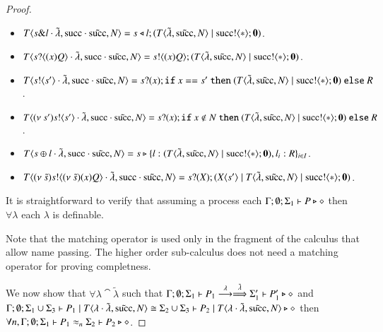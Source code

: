 \begin{proof}
\begin{itemize}
		\item	$T\langle s \& l \cdot \tilde{\lambda}, \textrm{succ} \cdot \tilde{\textrm{succ}}, N \rangle = s \triangleleft l ; (T\langle \tilde{\lambda}, \tilde{\textrm{succ}}, N \rangle \;|\; \textrm{succ} ! \langle \ast \rangle ; \mathbf{0})$.

		\item	$T\langle s ? \langle (x)Q \rangle \cdot \tilde{\lambda}, \textrm{succ} \cdot \tilde{\textrm{succ}}, N \rangle = s ! \langle (x)Q \rangle ; (T\langle \tilde{\lambda}, \tilde{\textrm{succ}}, N \rangle \;|\; \textrm{succ} ! \langle \ast \rangle ; \mathbf{0})$.

		\item	$T\langle s ! \langle s' \rangle \cdot \tilde{\lambda}, \textrm{succ} \cdot \tilde{\textrm{succ}}, N \rangle = s ? (x) ; \mathtt{if}\  x == s'\ \mathtt{then}\  (T\langle \tilde{\lambda}, \tilde{\textrm{succ}}, N \rangle \;|\; \textrm{succ} ! \langle \ast \rangle ; \mathbf{0})\  \mathtt{else}\  R$.

		\item	$T\langle (\nu\ s') s ! \langle s' \rangle \cdot \tilde{\lambda}, \textrm{succ} \cdot \tilde{\textrm{succ}}, N \rangle = s ? (x) ; \mathtt{if}\  x \notin N\ \mathtt{then}\  (T\langle \tilde{\lambda}, \tilde{\textrm{succ}}, N \rangle \;|\; \textrm{succ} ! \langle \ast \rangle ; \mathbf{0})\  \mathtt{else}\  R$.

		\item	$T\langle s \oplus l \cdot \tilde{\lambda}, \textrm{succ} \cdot \tilde{\textrm{succ}}, N \rangle = s \triangleright \{l:(T\langle \tilde{\lambda}, \tilde{\textrm{succ}}, N \rangle \;|\; \textrm{succ} ! \langle \ast \rangle ; \mathbf{0}), l_i: R\}_{i \in I}$.

		\item	$T\langle (\nu\ \tilde{s}) s ! \langle (\nu\ \tilde{s}) (x)Q \rangle \cdot \tilde{\lambda}, \textrm{succ} \cdot \tilde{\textrm{succ}}, N \rangle = s ? (X) ; (X\langle s' \rangle \;|\; T\langle \tilde{\lambda}, \tilde{\textrm{succ}}, N \rangle \;|\; \textrm{succ} ! \langle \ast \rangle ; \mathbf{0})$. 
	\end{itemize}

	It is straightforward to verify that assuming a process each $\Gamma; \emptyset; \Sigma_1 \vdash P \triangleright \diamond$ then $\forall \lambda$ each $\lambda$ is definable.

	Note that the matching operator is used only in the fragment of
	the calculus that allow name passing. The higher order sub-calculus
	does not need a matching operator for proving completness.

	We now show that $\forall \lambda \cat \tilde{\lambda}$ such that $\Gamma; \emptyset; \Sigma_1 \vdash P_1 \stackrel{\lambda}{\longrightarrow} \stackrel{\tilde{\lambda}}{\Longrightarrow} \Sigma_1' \vdash P_1' \triangleright \diamond$
	and $\Gamma; \emptyset; \Sigma_1 \cup \Sigma_3 \vdash P_1 \;|\; T\langle \lambda \cdot \tilde{\lambda}, \tilde{\textrm{succ}}, N \rangle \cong \Sigma_2 \cup \Sigma_3 \vdash P_2 \;|\; T\langle \lambda \cdot \tilde{\lambda}, \tilde{\textrm{succ}}, N \rangle \triangleright \diamond$ then $\forall n, \Gamma; \emptyset; \Sigma_1 \vdash P_1 \approx_n \Sigma_2 \vdash P_2 \triangleright \diamond$.


\end{proof}

